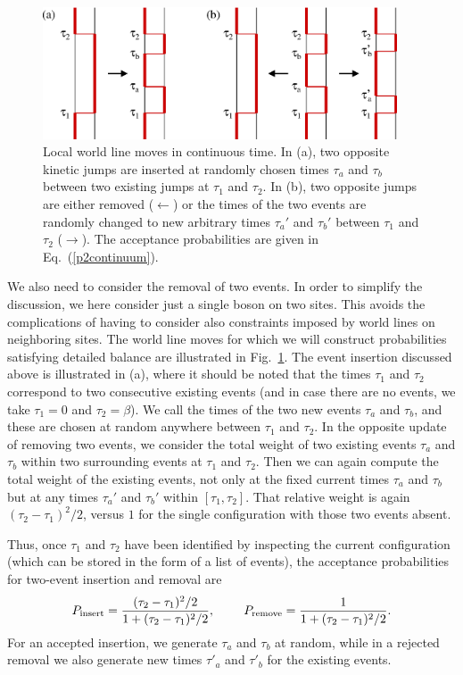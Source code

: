 \documentclass[draft,numberedheadings]{aipproc}
\begin{document}
\begin{figure}
\includegraphics[width=10.5cm]{ctime.eps}
\caption{Local world line moves in continuous time. In (a), two opposite kinetic jumps are inserted at randomly chosen times $\tau_a$ and $\tau_b$ between
two existing jumps at $\tau_1$ and $\tau_2$. In (b), two opposite jumps are either removed ($\leftarrow$) or the times of the two events are randomly changed 
to new arbitrary times $\tau_a'$ and $\tau_b'$ between $\tau_1$ and $\tau_2$ ($\rightarrow$). The acceptance probabilities are given in Eq.~(\ref{p2continuum}).}
\label{ctime}
\end{figure}

We also need to consider the removal of two events. In order to simplify the discussion, we here consider just a single boson on two sites. This avoids the 
complications of having to consider also constraints imposed by world lines on neighboring sites. The world line moves for which we will construct probabilities 
satisfying detailed balance are illustrated in Fig.~\ref{ctime}. The event insertion discussed above is illustrated in (a), where it should be noted that 
the times $\tau_1$ and $\tau_2$ correspond to two consecutive existing events (and in case there are no events, we take $\tau_1=0$ and $\tau_2=\beta$). We call 
the times of the two new events $\tau_a$ and $\tau_b$, and these are chosen at random anywhere between $\tau_1$ and $\tau_2$. In the opposite update of removing 
two events, we consider the total weight of two existing events $\tau_a$ and $\tau_b$ within two surrounding events at $\tau_1$ and $\tau_2$. Then we can again 
compute the total weight of the existing events, not only at the fixed current times $\tau_a$ and $\tau_b$ but at any times $\tau_a'$ and $\tau_b'$ within 
$[\tau_1,\tau_2]$. That relative weight is again $(\tau_2-\tau_1)^2/2$, versus $1$ for the single configuration with those two events absent. 

Thus, once $\tau_1$ and $\tau_2$ have been identified by inspecting the current configuration (which can be stored in the form of a list of events),
the acceptance probabilities for two-event insertion and removal are
\begin{equation}
P_{\rm insert} = \frac{(\tau_2-\tau_1)^2/2}{1+(\tau_2-\tau_1)^2/2},~~~~~~~
P_{\rm remove} = \frac{1}{1+(\tau_2-\tau_1)^2/2}.\label{p2continuum}
\end{equation}
For an accepted insertion, we generate $\tau_a$ and $\tau_b$ at random, while in a rejected removal we also generate new times $\tau'_a$ and $\tau'_b$
for the existing events.
\end{document}
